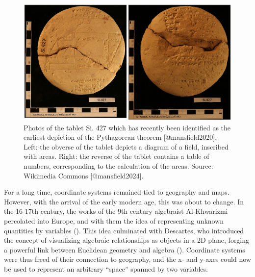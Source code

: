 \documentclass[
]{book}
\begin{document}
\begin{figure}

{\centering \includegraphics[width=29in]{./figures/si427} 

}

\caption{Photos of the tablet Si. 427 which has recently been identified as the earliest depiction of the Pythagorean theorem [@mansfield2020]. Left: the obverse of the tablet depicts a diagram of a field, inscribed with areas. Right: the reverse of the tablet contains a table of numbers, corresponding to the calculation of the areas. Source: Wikimedia Commons [@mansfield2024].}\label{fig:unnamed-chunk-3}
\end{figure}

For a long time, coordinate systems remained tied to geography and maps. However, with the arrival of the early modern age, this was about to change. In the 16-17th century, the works of the 9th century algebraist Al-Khwarizmi percolated into Europe, and with them the idea of representing unknown quantities by variables (). This idea culminated with Descartes, who introduced the concept of visualizing algebraic relationships as objects in a 2D plane, forging a powerful link between Euclidean geometry and algebra (). Coordinate systems were thus freed of their connection to geography, and the x- and y-axes could now be used to represent an arbitrary ``space'' spanned by two variables.
\end{document}
